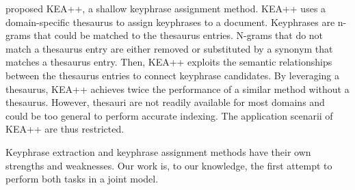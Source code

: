      proposed KEA++, a %
    shallow keyphrase assignment method.
    KEA++ uses a domain-specific thesaurus to assign keyphrases to a document. Keyphrases are n-grams that could be matched to the thesaurus entries.
    N-grams %
    that do not match a thesaurus entry are either removed or substituted by a synonym that matches a thesaurus entry. 
    Then, KEA++ %
    exploits the semantic relationships between the thesaurus entries to connect keyphrase candidates.
    By leveraging a thesaurus, KEA++ achieves twice the performance of a similar method without a thesaurus.
    However, thesauri are not readily available for most domains and could be too general to perform accurate indexing. 
    The application scenarii of KEA++ are thus restricted.

    
    
    Keyphrase extraction and keyphrase assignment methods have their own strengths and weaknesses.
    Our work is, to our knowledge, the first attempt to perform both tasks in a joint model.
    
    
    

